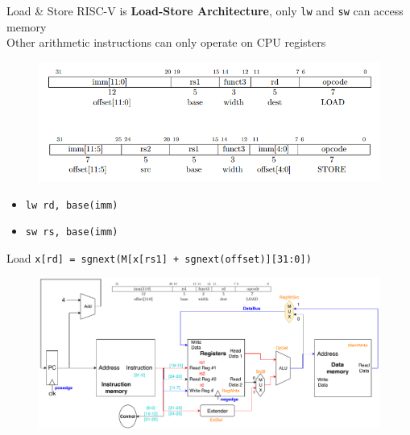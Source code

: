 \documentclass[UTF8]{ctexbeamer}
\begin{document}
\begin{frame}[fragile]{Load \& Store}
RISC-V is \textbf{Load-Store Architecture}, only \verb'lw' and \verb'sw' can access memory\\
Other arithmetic instructions can only operate on CPU registers
\begin{figure}
\centering
\includegraphics[width=\linewidth]{fig/Lecture2/lw-sw.PNG}
\end{figure}
\begin{itemize}
	\item \verb'lw rd, base(imm)'
	\item \verb'sw rs, base(imm)'
\end{itemize}
\end{frame}

\begin{frame}[fragile]{Load}
\verb'x[rd] = sgnext(M[x[rs1] + sgnext(offset)][31:0])'
\begin{figure}
\centering
\includegraphics[width=\linewidth]{fig/Lecture2/Datapath-lw.pdf}
\end{figure}
\end{frame}
\end{document}

